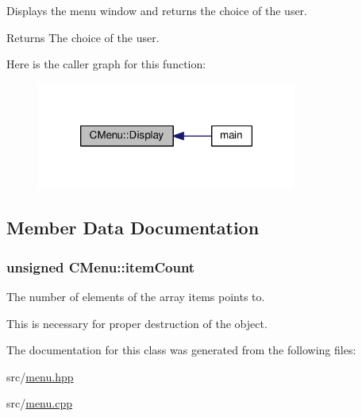 Displays the menu window and returns the choice of the user. 

\begin{DoxyReturn}{Returns}
The choice of the user. 
\end{DoxyReturn}


Here is the caller graph for this function\-:
\nopagebreak
\begin{figure}[H]
\begin{center}
\leavevmode
\includegraphics[width=242pt]{class_c_menu_a6cc86670a0f6bfc0ac9a97d938226b5c_icgraph}
\end{center}
\end{figure}




\subsection{Member Data Documentation}
\hypertarget{class_c_menu_a4903eda2d318231beca52dac4373fda6}{
\subsubsection[{item\-Count}]{\setlength{\rightskip}{0pt plus 5cm}unsigned C\-Menu\-::item\-Count\hspace{0.3cm}{\ttfamily [private]}}}\label{class_c_menu_a4903eda2d318231beca52dac4373fda6}


The number of elements of the array items points to. 

This is necessary for proper destruction of the object. 

The documentation for this class was generated from the following files\-:\begin{DoxyCompactItemize}
\item 
src/\hyperlink{menu_8hpp}{menu.\-hpp}\item 
src/\hyperlink{menu_8cpp}{menu.\-cpp}\end{DoxyCompactItemize}
